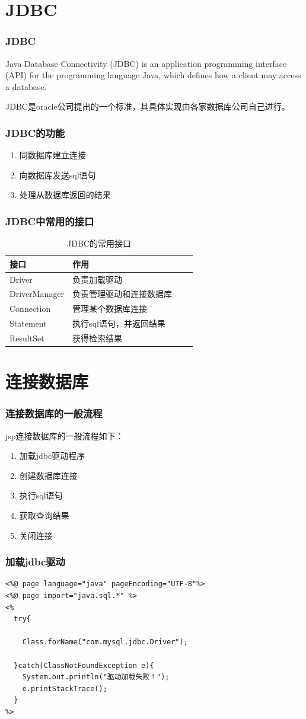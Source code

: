 \documentclass{beamer}
\begin{document}
\section{JDBC}
\begin{frame}
\frametitle{JDBC}
Java Database Connectivity (JDBC) is an application programming interface (API) for the programming language Java, which defines how a client may access a database. 

JDBC是oracle公司提出的一个标准，其具体实现由各家数据库公司自己进行。
\end{frame}
\begin{frame}
\frametitle{JDBC的功能}
\begin{enumerate}
\item
同数据库建立连接
\item
向数据库发送sql语句
\item
处理从数据库返回的结果
\end{enumerate}
\end{frame}
\begin{frame}

\frametitle{JDBC中常用的接口}
\begin{table}
\begin{tabular}{l l l l }
\toprule
\textbf{接口} & \textbf{作用}\\
\midrule
Driver & 负责加载驱动 \\
DriverManager & 负责管理驱动和连接数据库\\
Connection & 管理某个数据库连接 \\
Statement  & 执行sql语句，并返回结果 \\
ResultSet & 获得检索结果 \\
\bottomrule
\end{tabular}
\caption{JDBC的常用接口}
\end{table}
\end{frame}
\section{连接数据库}
\begin{frame}
\frametitle{连接数据库的一般流程}
jsp连接数据库的一般流程如下：
\begin{enumerate}
\item
加载jdbc驱动程序
\item
创建数据库连接
\item
执行sql语句
\item
获取查询结果
\item
关闭连接
\end{enumerate}
\end{frame}
\begin{frame}[fragile]
\frametitle{加载jdbc驱动}
\begin{lstlisting}
<%@ page language="java" pageEncoding="UTF-8"%>
<%@ page import="java.sql.*" %>
<%
  try{
  
    Class.forName("com.mysql.jdbc.Driver");
    
  }catch(ClassNotFoundException e){
    System.out.println("驱动加载失败！");
    e.printStackTrace();
  }
%>
\end{lstlisting}
\end{frame}
\end{document}
